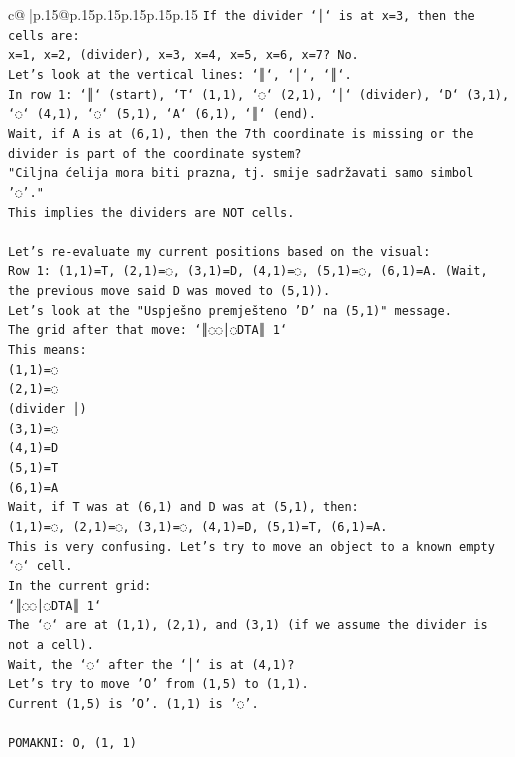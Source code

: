 \documentclass{article}
\begin{document}
{\begin{supertabular}{c@{$\;$}|p{.15\linewidth}@{}p{.15\linewidth}p{.15\linewidth}p{.15\linewidth}p{.15\linewidth}p{.15\linewidth}}
{{{\texttt{If the divider `│` is at x=3, then the cells are:} \\
\texttt{x=1, x=2, (divider), x=3, x=4, x=5, x=6, x=7? No.} \\
\texttt{Let's look at the vertical lines: `║`, `│`, `║`.} \\
\texttt{In row 1: `║` (start), `T` (1,1), `◌` (2,1), `│` (divider), `D` (3,1), `◌` (4,1), `◌` (5,1), `A` (6,1), `║` (end).} \\
\texttt{Wait, if A is at (6,1), then the 7th coordinate is missing or the divider is part of the coordinate system?} \\
\texttt{"Ciljna ćelija mora biti prazna, tj. smije sadržavati samo simbol '◌'."} \\
\texttt{This implies the dividers are NOT cells.} \\
\\ 
\texttt{Let's re{-}evaluate my current positions based on the visual:} \\
\texttt{Row 1: (1,1)=T, (2,1)=◌, (3,1)=D, (4,1)=◌, (5,1)=◌, (6,1)=A. (Wait, the previous move said D was moved to (5,1)).} \\
\texttt{Let's look at the "Uspješno premješteno 'D' na (5,1)" message.} \\
\texttt{The grid after that move: `║◌◌│◌DTA║ 1`} \\
\texttt{This means:} \\
\texttt{(1,1)=◌} \\
\texttt{(2,1)=◌} \\
\texttt{(divider │)} \\
\texttt{(3,1)=◌} \\
\texttt{(4,1)=D} \\
\texttt{(5,1)=T} \\
\texttt{(6,1)=A} \\
\texttt{Wait, if T was at (6,1) and D was at (5,1), then:} \\
\texttt{(1,1)=◌, (2,1)=◌, (3,1)=◌, (4,1)=D, (5,1)=T, (6,1)=A.} \\
\texttt{This is very confusing. Let's try to move an object to a known empty `◌` cell.} \\
\texttt{In the current grid:} \\
\texttt{`║◌◌│◌DTA║ 1`} \\
\texttt{The `◌` are at (1,1), (2,1), and (3,1) (if we assume the divider is not a cell).} \\
\texttt{Wait, the `◌` after the `│` is at (4,1)?} \\
\texttt{Let's try to move 'O' from (1,5) to (1,1).} \\
\texttt{Current (1,5) is 'O'. (1,1) is '◌'.} \\
\\ 
\texttt{POMAKNI: O, (1, 1)} \\
            }
        }
    }
     \\ \\


\end{supertabular}}
\end{document}
